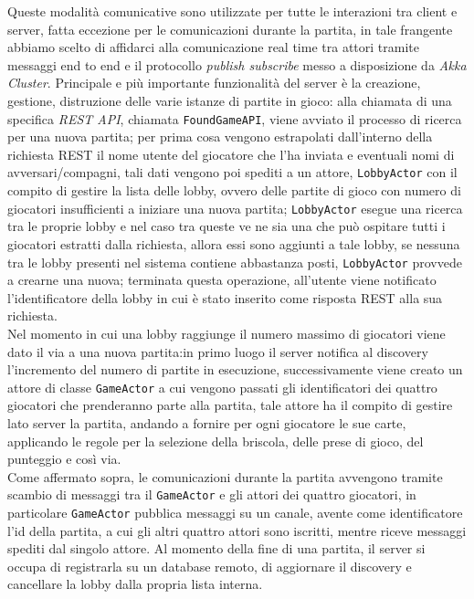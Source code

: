       Queste modalità comunicative sono utilizzate per tutte le interazioni tra client e server, fatta eccezione per le comunicazioni durante la partita, in tale frangente abbiamo scelto di affidarci alla comunicazione real time tra attori tramite messaggi end to end e il protocollo \textit{publish subscribe} messo a disposizione da \textit{Akka Cluster}.
      Principale e più importante funzionalità del server è la creazione, gestione, distruzione delle varie istanze di partite in gioco:
      alla chiamata di una specifica \textit{REST API}, chiamata \texttt{FoundGameAPI}, viene avviato il processo di ricerca per una nuova partita; per prima cosa vengono estrapolati dall'interno della richiesta REST il nome utente del giocatore che l'ha inviata e eventuali nomi di avversari/compagni, tali dati vengono poi spediti a un attore, \texttt{LobbyActor} con il compito di gestire la lista delle lobby, ovvero delle partite di gioco con numero di giocatori insufficienti a iniziare una nuova partita; \texttt{LobbyActor} esegue una ricerca tra le proprie lobby e  nel caso tra queste ve ne sia una che può ospitare tutti i giocatori estratti dalla richiesta, allora essi sono aggiunti a tale lobby, se nessuna tra le lobby presenti nel sistema contiene abbastanza posti, \texttt{LobbyActor} provvede a crearne una nuova; terminata questa operazione, all'utente viene notificato l'identificatore della lobby in cui è stato inserito come risposta REST alla sua richiesta. \\
      Nel momento in cui una lobby raggiunge il numero massimo di giocatori viene dato il via a una nuova partita:in primo luogo il server notifica al discovery l'incremento del numero di partite in esecuzione, successivamente viene creato un attore di classe \texttt{GameActor} a cui vengono passati gli identificatori dei quattro giocatori che prenderanno parte alla partita, tale attore ha il compito di gestire lato server la partita, andando a fornire per ogni giocatore le sue carte, applicando le regole per la selezione della briscola, delle prese di gioco, del punteggio e così via.\\
      Come affermato sopra, le comunicazioni durante la partita avvengono tramite scambio di messaggi tra il \texttt{GameActor} e gli attori dei quattro giocatori, in particolare \texttt{GameActor} pubblica messaggi su un canale, avente come identificatore l'id della partita, a cui gli altri quattro attori sono iscritti, mentre riceve messaggi spediti dal singolo attore.
      Al momento della fine di una partita, il server si occupa di registrarla su un database remoto, di aggiornare il discovery e cancellare la lobby dalla propria lista interna.\\
